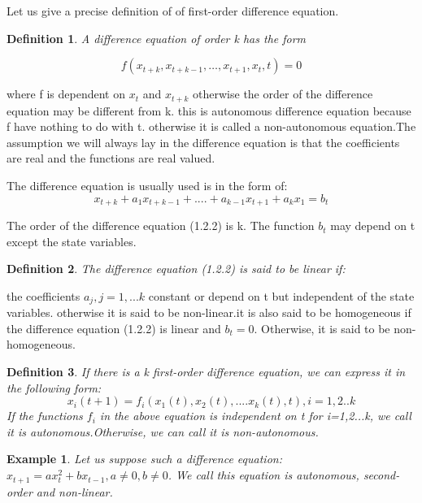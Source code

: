 \documentclass[12pt]{article}
\newtheorem{definition}{Definition}[section]
\newtheorem{example}{Example}[section]
\begin{document}
Let us give a precise definition of of first-order difference equation.

\begin{definition}
A difference equation of order k has the form 
\end{definition}

\begin{equation} 
f(x_{t+k}, x_{t+k-1}, …, x_{t+1}, x_{t}, t) =0 \tag{1.2.1}
\end{equation}

where f is dependent on $x_{t}$ and $x_{t+k}$ otherwise the order of the difference equation may be different from k. this is autonomous difference equation because f have nothing to do with t. otherwise it is called a non-autonomous equation.The assumption we will always lay in the difference equation is that the coefficients are real and the functions are real valued. 

The difference equation is usually used is in the form of:
\begin{equation}
x_{t+k}+a_{1}x_{t+k-1}+....+a_{k-1}x_{t+1}+a_{k}x_{1}=b_{t}\tag{1.2.2}
\end{equation}

The order of the difference equation (1.2.2) is k. The function $b_{t}$ may depend on t except the state variables.



\begin{definition}
The difference equation (1.2.2) is said to be linear if:
\end{definition}

the coefficients $a_{j},j=1,...k$ constant or depend on t but independent of the state variables. otherwise it is said to be non-linear.it is also said to be homogeneous if the difference equation (1.2.2) is linear and $b_{t}=0$. Otherwise, it is said to be non-homogeneous.  

\begin{definition}
If there is a k first-order difference equation, we can express it in the following form:
\begin{equation}
    x_{i}(t+1) = f_{i}(x_{1}(t), x_{2}(t),....x_{k}(t), t), i=1,2..k\tag{1.2.3}
\end{equation}
If the functions $f_{i}$ in the above equation is independent on t for i=1,2...k, we call it is autonomous.Otherwise, we can call it is non-autonomous.
\end{definition}


\begin{example}
Let us suppose such a difference equation: $x_{t+1} = ax_t^2+bx_{t-1}, a\neq0, b\neq0$. We call this equation is autonomous, second-order and non-linear.
\end{example}
\end{document}
